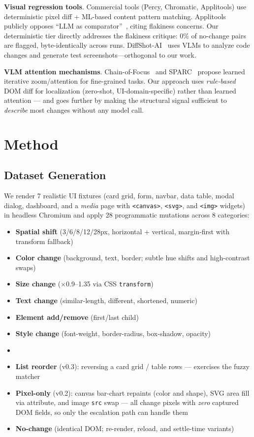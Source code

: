 \documentclass[10pt,twocolumn,letterpaper]{article}
\begin{document}
\textbf{Visual regression tools}. Commercial tools (Percy, Chromatic, Applitools) use deterministic pixel diff + ML-based content pattern matching. Applitools publicly opposes ``LLM as comparator''~\cite{applitools2026mcp}, citing flakiness concerns. Our deterministic tier directly addresses the flakiness critique: 0\% of no-change pairs are flagged, byte-identically across runs. DiffShot-AI~\cite{diffshot2026} uses VLMs to analyze code changes and generate test screenshots—orthogonal to our work.

\textbf{VLM attention mechanisms}. Chain-of-Focus~\cite{chainoffocus2026} and SPARC~\cite{sparc2026} propose learned iterative zoom/attention for fine-grained tasks. Our approach uses \textit{rule-based} DOM diff for localization (zero-shot, UI-domain-specific) rather than learned attention — and goes further by making the structural signal sufficient to \textit{describe} most changes without any model call.

\section{Method}

\subsection{Dataset Generation}

We render 7 realistic UI fixtures (card grid, form, navbar, data table, modal dialog, dashboard, and a \textit{media} page with \texttt{<canvas>}, \texttt{<svg>}, and \texttt{<img>} widgets) in headless Chromium and apply 28 programmatic mutations across 8 categories:

\begin{itemize}
\item \textbf{Spatial shift} (3/6/8/12/28px, horizontal + vertical, margin-first with transform fallback)
\item \textbf{Color change} (background, text, border; subtle hue shifts and high-contrast swaps)
\item \textbf{Size change} ($\times$0.9--1.35 via CSS \texttt{transform})
\item \textbf{Text change} (similar-length, different, shortened, numeric)
\item \textbf{Element add/remove} (first/last child)
\item \textbf{Style change} (font-weight, border-radius, box-shadow, opacity)
\item \item \textbf{List reorder} (v0.3): reversing a card grid / table rows — exercises the fuzzy matcher
\item \textbf{Pixel-only} (v0.2): canvas bar-chart repaints (color and shape), SVG area fill via attribute, and image \texttt{src} swap — all change pixels with \textit{zero} captured DOM fields, so only the escalation path can handle them
\item \textbf{No-change} (identical DOM; re-render, reload, and settle-time variants)
\end{itemize}
\end{document}
